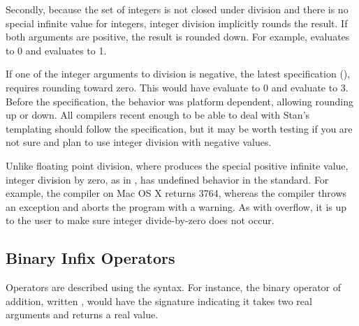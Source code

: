 Secondly, because the set of integers is not closed under division and
there is no special infinite value for integers, integer division
implicitly rounds the result.  If both arguments are positive, the
result is rounded down.  For example,  evaluates to 0 and
 evaluates to 1.  

If one of the integer arguments to division is negative, the latest
\Cpp specification (), requires rounding toward zero.  This
would have  evaluate to 0 and  evaluate to
3.  Before the  specification, the behavior was platform
dependent, allowing rounding up or down.  All compilers recent enough
to be able to deal with Stan's templating should follow the 
specification, but it may be worth testing if you are not sure and
plan to use integer division with negative values.

Unlike floating point division, where  produces the
special positive infinite value, integer division by zero, as in
, has undefined behavior in the \Cpp standard.  For
example, the \clang compiler on Mac OS X returns 3764, whereas the
\gpp compiler throws an exception and aborts the program with a
warning.  As with overflow, it is up to the user to make sure integer
divide-by-zero does not occur.

\subsection{Binary Infix Operators}

Operators are described using the \Cpp syntax.  For instance, the
binary operator of addition, written , would have the
\Stan signature  indicating it takes
two real arguments and returns a real value.

\begin{description}
%
%
%
%
%
\end{description}

